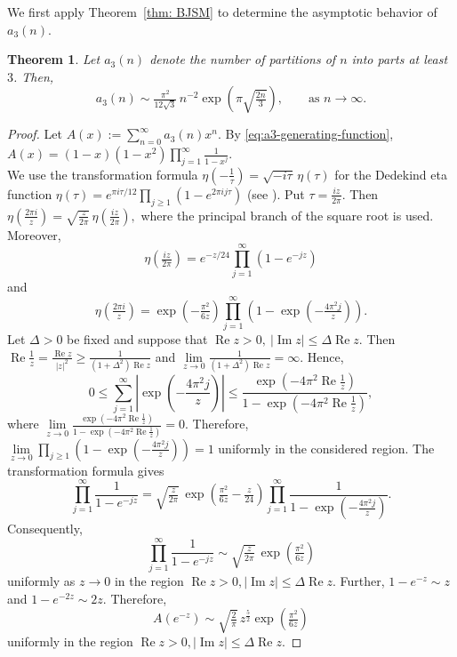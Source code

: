 \documentclass[12pt,a4paper]{amsart}
\numberwithin{equation}{section}
\theoremstyle{plain}
\newtheorem{thm}{Theorem}[section]
\theoremstyle{definition}
\theoremstyle{remark}
\begin{document}
We first apply Theorem~\ref{thm: BJSM} to determine the asymptotic behavior of $a_3(n)$.
\begin{thm}\label{thma3}
Let $a_3(n)$ denote the number of partitions of $n$ into parts at least $3$. Then, 
$$
a_3(n)
\sim
\tfrac{\pi^2}{12\sqrt3}\,
n^{-2}
\exp\left(\pi\sqrt{\tfrac{2n}{3}}\right),\qquad\text{as }n\to\infty.
$$
\end{thm}

\begin{proof}
Let
$
A(x):=\sum_{n=0}^{\infty}a_3(n)x^n.
$
By \eqref{eq:a3-generating-function},
$
A(x)
=
(1-x)(1-x^2)
\prod_{j=1}^{\infty}\frac{1}{1-x^j}.
$\\
We use the transformation formula
$
\eta\left(-\frac1\tau\right)
=
\sqrt{-i\tau}\,\eta(\tau)
$
for the Dedekind eta function
$
\eta(\tau)
=
e^{\pi i\tau/12}
\prod_{j\geq1}\left(1-e^{2\pi i j\tau}\right)
$
(see \cite[Chapter~3]{ApostolModularFunctions}). Put
$
\tau=\frac{iz}{2\pi}.
$
Then
$
\eta\left(\frac{2\pi i}{z}\right)
=
\sqrt{\frac{z}{2\pi}}\,
\eta\left(\frac{iz}{2\pi}\right),
$
where the principal branch of the square root is used. Moreover,
$$
\eta\left(\tfrac{iz}{2\pi}\right)
=
e^{-z/24}
\prod_{j=1}^\infty\left(1-e^{-jz}\right)
$$
and
$$
\eta\left(\tfrac{2\pi i}{z}\right)
=
\exp\left(-\tfrac{\pi^2}{6z}\right)
\prod_{j=1}^\infty
\left(1-\exp\left(-\tfrac{4\pi^2j}{z}\right)\right).
$$
Let $\Delta>0$ be fixed and suppose that
$
\operatorname{Re}z>0,
\
|\operatorname{Im}z|
\le 
\Delta\operatorname{Re}z.
$ Then
$
\operatorname{Re}\frac1z
=
\frac{\operatorname{Re}z}{|z|^2}
\geq
\frac{1}{(1+\Delta^2)\operatorname{Re}z}
$
and $\lim\limits_{z\to0} \frac{1}{(1+\Delta^2)\operatorname{Re}z}
=\infty$. Hence,
$$
0\le \sum_{j=1}^\infty
\left|
\exp\left(-\frac{4\pi^2j}{z}\right)
\right|
\le
\frac{
\exp\left(-4\pi^2\operatorname{Re}\frac1z\right)
}{
1-\exp\left(-4\pi^2\operatorname{Re}\frac1z\right)
},
$$
where $ \lim\limits_{z\to0}\frac{
\exp\left(-4\pi^2\operatorname{Re}\frac1z\right)
}{
1-\exp\left(-4\pi^2\operatorname{Re}\frac1z\right)}=0.$ Therefore,
$
\lim\limits_{z\to0}\prod_{j\geq1}
\left(1-\exp\left(-\frac{4\pi^2j}{z}\right)\right)
=1
$
uniformly in the considered region. The transformation formula gives
$$
\prod_{j=1}^\infty\frac{1}{1-e^{-jz}}=\sqrt{\tfrac{z}{2\pi}}\,
\exp\left(\tfrac{\pi^2}{6z}-\tfrac{z}{24}\right)
\prod_{j=1}^\infty
\frac{1}{
1-\exp\left(-\frac{4\pi^2j}{z}\right)
}.
$$
Consequently,
\begin{equation}\label{etafor}
\prod_{j=1}^\infty\frac{1}{1-e^{-jz}}
\sim
\sqrt{\tfrac{z}{2\pi}}\,
\exp\left(\tfrac{\pi^2}{6z}\right)
\end{equation}
uniformly as $z\to0$ in the region
$
\operatorname{Re}z>0,
|\operatorname{Im}z|
\le
\Delta\operatorname{Re}z.
$ Further,
$
1-e^{-z}\sim z$ and\linebreak 
$1-e^{-2z}\sim2z.
$
Therefore,
$$
A(e^{-z})
\sim
\sqrt{\tfrac{2}{\pi}}\,
z^{\frac{5}{2}}
\exp\left(\tfrac{\pi^2}{6z}\right)
$$
uniformly in the region
$
\operatorname{Re}z>0,
|\operatorname{Im}z|
\le
\Delta\operatorname{Re}z.
$



\end{proof}
\end{document}
